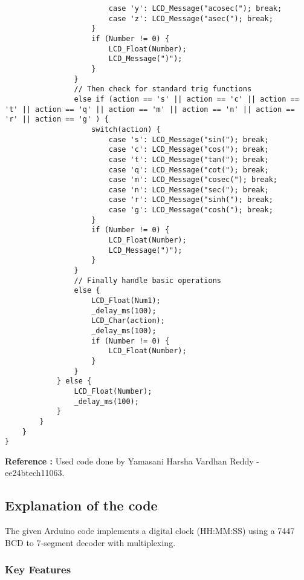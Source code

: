 \documentclass{article}
\begin{document}
\begin{verbatim}
                        case 'y': LCD_Message("acosec("); break;
                        case 'z': LCD_Message("asec("); break;
                    }
                    if (Number != 0) {
                        LCD_Float(Number);
                        LCD_Message(")");
                    }
                }
                // Then check for standard trig functions
                else if (action == 's' || action == 'c' || action == 't' || action == 'q' || action == 'm' || action == 'n' || action == 'r' || action == 'g' ) {
                    switch(action) {
                        case 's': LCD_Message("sin("); break;
                        case 'c': LCD_Message("cos("); break;
                        case 't': LCD_Message("tan("); break;
                        case 'q': LCD_Message("cot("); break;
                        case 'm': LCD_Message("cosec("); break;
                        case 'n': LCD_Message("sec("); break;
                        case 'r': LCD_Message("sinh("); break;
                        case 'g': LCD_Message("cosh("); break;
                    }
                    if (Number != 0) {
                        LCD_Float(Number);
                        LCD_Message(")");
                    }
                }
                // Finally handle basic operations
                else {
                    LCD_Float(Num1);
                    _delay_ms(100);
                    LCD_Char(action);
                    _delay_ms(100);
                    if (Number != 0) {
                        LCD_Float(Number);
                    }
                }
            } else {
                LCD_Float(Number);
                _delay_ms(100);
            }
        }
    }
}

\end{verbatim}
\textbf{Reference :} Used code done by  Yamasani Harsha Vardhan Reddy - ee24btech11063.
\subsection{Explanation of the code}

The given Arduino code implements a digital clock (HH:MM:SS) using a 7447 BCD to 7-segment decoder with multiplexing.

\subsubsection{\textbf{\textrm{Key Features}}}
\end{document}
